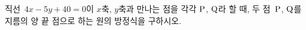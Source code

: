 직선~$4x-5y+40=0$이 $x$축, $y$축과 만나는 점을 각각 $\mathrm{P}$, $\mathrm{Q}$라 할 때, 두 점~$\mathrm{P}$, $\mathrm{Q}$를 지름의 양 끝 점으로 하는 원의 방정식을 구하시오.

